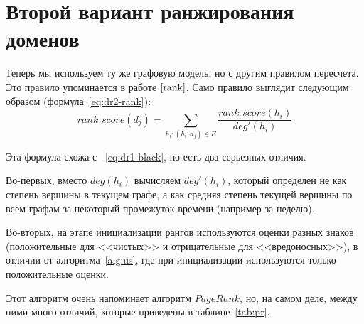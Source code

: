 \documentclass[a4paper,14pt]{extreport} %
\begin{document}
\section{Второй вариант ранжирования доменов}
Теперь мы используем ту же графовую модель, но с другим правилом пересчета. Это правило упоминается в работе $\cite{rank}$. Само правило выглядит следующим образом (формула~\ref{eq:dr2-rank}):
\begin{equation}
	\label{eq:dr2-rank}
	rank\_score(d_j) = \sum_{h_i: (h_i, d_j)\in E} \frac{rank\_score(h_i)}{deg'(h_i)}
\end{equation}
	
Эта формула схожа с ~\ref{eq:dr1-black}, но есть два серьезных отличия. 

Во-первых, вместо $deg(h_i)$ вычисляем $deg'(h_i)$, который определен не как степень вершины в текущем графе, а как средняя степень текущей вершины по всем графам за некоторый промежуток времени (например за неделю). 

Во-вторых, на этапе инициализации рангов используются оценки разных знаков (положительные для <<чистых>> и отрицательные для <<вредоносных>>), в отличии от алгоритма~\ref{alg:us}, где при инициализации используются только положительные оценки. 

Этот алгоритм очень напоминает алгоритм $PageRank$, но, на самом деле, между ними много отличий, которые приведены в таблице~\ref{tab:pr}.
\end{document}

